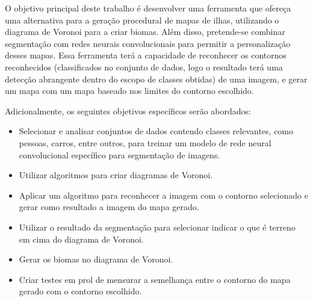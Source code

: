 O objetivo principal deste trabalho é desenvolver uma ferramenta que ofereça uma alternativa para a geração procedural de mapas de ilhas, utilizando o diagrama de Voronoi para a criar biomas. Além disso, pretende-se combinar segmentação com redes neurais convolucionais para permitir a personalização desses mapas. Essa ferramenta terá a capacidade de reconhecer os contornos reconhecidos (classificados no conjunto de dados, logo o resultado terá uma detecção abrangente dentro do escopo de classes obtidas) de uma imagem, e gerar um mapa com um mapa baseado nos limites do contorno escolhido.

Adicionalmente, os seguintes objetivos específicos serão abordados:

\begin{itemize}
	\item Selecionar e analisar conjuntos de dados contendo classes relevantes, como pessoas, carros, entre outros, para treinar um modelo de rede neural convolucional específico para segmentação de imagens.
	\item Utilizar algoritmos para criar diagramas de Voronoi.
	\item Aplicar um algoritmo para reconhecer a imagem com o contorno selecionado e gerar como resultado a imagem do mapa gerado.
	\item Utilizar o resultado da segmentação para selecionar indicar o que é terreno em cima do diagrama de Voronoi.
	\item Gerar os biomas no diagrama de Voronoi.
	\item Criar testes em prol de mensurar a semelhança entre o contorno do mapa gerado com o contorno escolhido.
\end{itemize}